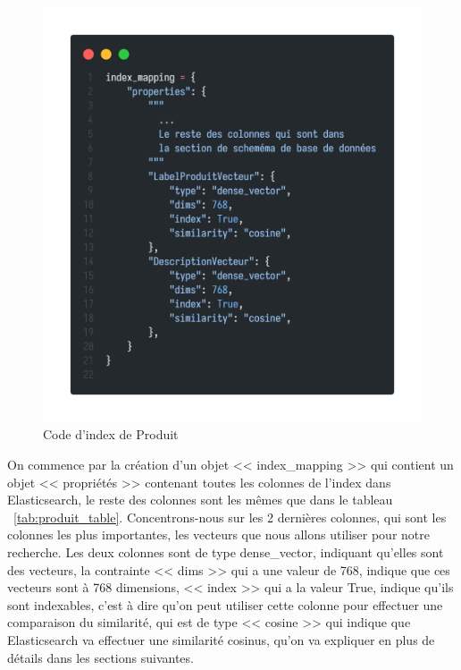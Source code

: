 \begin{figure}[H]
	\centering
	\includegraphics[width=\textwidth,height=0.75\textheight,keepaspectratio]{logos/index_mapping.png}
	\caption{Code d'index de Produit}
	\label{fig:indexmappingproduit}
\end{figure}

\newpage
\noindent
On commence par la création d'un objet << index\_mapping >> qui contient un objet << propriétés >> contenant toutes les colonnes de l'index dans Elasticsearch, le reste des colonnes sont les mêmes que dans le tableau ~\ref{tab:produit_table}. Concentrons-nous sur les 2 dernières colonnes, qui sont les colonnes les plus importantes, les vecteurs que nous allons utiliser pour notre recherche. Les deux colonnes sont de type dense\_vector, indiquant qu'elles sont des vecteurs, la contrainte << dims >> qui a une valeur de 768, indique que ces vecteurs sont à 768 dimensions, << index >> qui a la valeur True, indique qu'ils sont indexables, c'est à dire qu'on peut utiliser cette colonne pour effectuer une comparaison du similarité, qui est de type << cosine >> qui indique que Elasticsearch va effectuer une similarité cosinus, qu'on va expliquer en plus de détails dans les sections suivantes.


